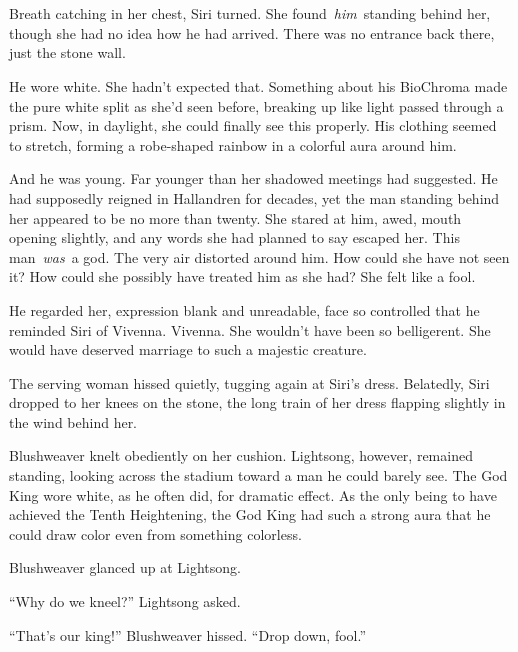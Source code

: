 \chapter{}

Breath catching in her chest, Siri turned. She found~\textit{him}~standing behind her, though she had no idea how he had arrived. There was no entrance back there, just the stone wall.

He wore white. She hadn’t expected that. Something about his BioChroma made the pure white split as she’d seen before, breaking up like light passed through a prism. Now, in daylight, she could finally see this properly. His clothing seemed to stretch, forming a robe-shaped rainbow in a colorful aura around him.

And he was young. Far younger than her shadowed meetings had suggested. He had supposedly reigned in Hallandren for decades, yet the man standing behind her appeared to be no more than twenty. She stared at him, awed, mouth opening slightly, and any words she had planned to say escaped her. This man~\textit{was}~a god. The very air distorted around him. How could she have not seen it? How could she possibly have treated him as she had? She felt like a fool.

He regarded her, expression blank and unreadable, face so controlled that he reminded Siri of Vivenna. Vivenna. She wouldn’t have been so belligerent. She would have deserved marriage to such a majestic creature.

The serving woman hissed quietly, tugging again at Siri’s dress. Belatedly, Siri dropped to her knees on the stone, the long train of her dress flapping slightly in the wind behind her.

\orn

Blushweaver knelt obediently on her cushion. Lightsong, however, remained standing, looking across the stadium toward a man he could barely see. The God King wore white, as he often did, for dramatic effect. As the only being to have achieved the Tenth Heightening, the God King had such a strong aura that he could draw color even from something colorless.

Blushweaver glanced up at Lightsong.

“Why do we kneel?” Lightsong asked.

“That’s our king!” Blushweaver hissed. “Drop down, fool.”


